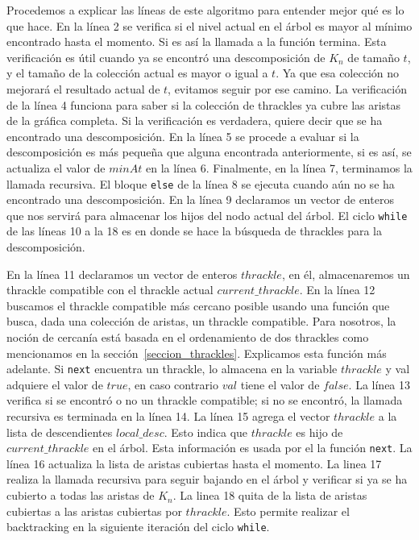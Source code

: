   Procedemos a explicar las líneas de este algoritmo para entender mejor qué es lo que hace. En la línea 2
  se verifica si el nivel actual en el árbol es mayor al mínimo encontrado hasta el momento. Si es así la
  llamada a la función termina. Esta verificación es útil cuando ya se encontró una descomposición de $K_n$
  de tamaño $t$, y el tamaño de la colección actual es mayor o igual a $t$. Ya que esa colección no
  mejorará el resultado actual de $t$, evitamos seguir por ese camino. La verificación de la línea 4
  funciona para saber si la colección de thrackles ya cubre las aristas de la gráfica completa. Si
  la verificación es verdadera, quiere decir que se ha encontrado una descomposición. En la línea 5 se
  procede a evaluar si la descomposición es más pequeña que alguna encontrada anteriormente, si es así, se
  actualiza el valor de $minAt$ en la línea 6. Finalmente, en la línea 7, terminamos la llamada recursiva.
  El bloque \texttt{else} de la línea 8 se ejecuta cuando aún no se ha encontrado una descomposición. En la
  línea 9 declaramos un vector de enteros que nos servirá para almacenar los hijos del nodo actual del
  árbol. El ciclo \texttt{while} de las líneas 10 a la 18 es en donde se hace la búsqueda de thrackles para
  la descomposición.

  En la línea 11 declaramos un vector de enteros $thrackle$, en él, almacenaremos un
  thrackle compatible con el thrackle actual $current\_thrackle$. En la línea 12 buscamos el thrackle
  compatible más cercano posible usando una función que busca, dada una colección de aristas, un
  thrackle compatible. Para nosotros, la noción de cercanía está basada en el ordenamiento de dos thrackles
  como mencionamos en la sección~\ref{seccion_thrackles}. Explicamos esta función más adelante. Si
  \texttt{next} encuentra un thrackle, lo almacena en la variable $thrackle$ y val adquiere el valor de
  $true$, en caso contrario $val$ tiene el valor de $false$. La línea 13 verifica si se encontró o no un
  thrackle compatible; si no se encontró, la llamada recursiva es terminada en la línea 14. La línea 15
  agrega el vector $thrackle$ a la lista de descendientes $local\_desc$. Esto indica que $thrackle$ es hijo
  de $current\_thrackle$ en el árbol. Esta información es usada por el la función \texttt{next}. La línea
  16 actualiza la lista de aristas cubiertas hasta el momento. La linea 17 realiza la llamada recursiva
  para seguir bajando en el árbol y verificar si ya se ha cubierto a todas las aristas de $K_n$. La linea
  18 quita de la lista de aristas cubiertas a las aristas cubiertas por $thrackle$. Esto permite realizar
  el backtracking en la siguiente iteración del ciclo \texttt{while}.

